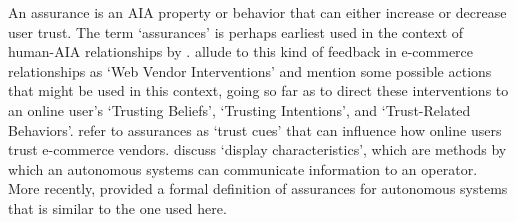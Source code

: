 

    An assurance is an AIA property or behavior that can either increase or decrease user trust. %
    The term `assurances' is perhaps earliest used in the context of human-AIA relationships by \citet{Sheridan1984-kx}. \citet{McKnight2001-fa} allude to this kind of feedback in e-commerce relationships as `Web Vendor Interventions' and mention some possible actions that might be used in this context, going so far as to direct these interventions to an online user's `Trusting Beliefs', `Trusting Intentions', and `Trust-Related Behaviors'. %
    \citet{Corritore2003-gx} refer to assurances as `trust cues' that can influence how online users trust e-commerce vendors. \citet{Lee2004-pv} discuss `display characteristics', which are methods by which an autonomous systems can communicate information to an operator. More recently, \citet{Lillard2016-yg} provided a formal definition of assurances for autonomous systems that is similar to the one used here. %

